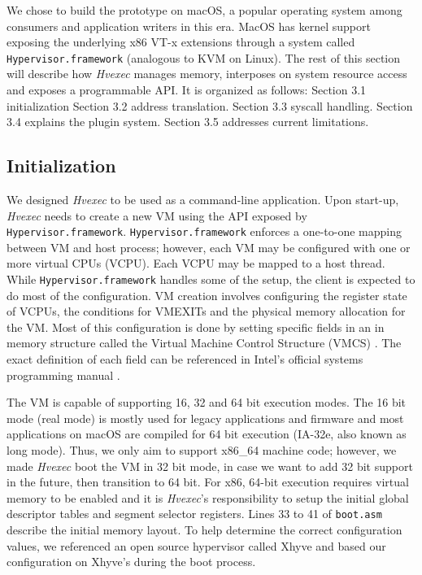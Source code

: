 \documentclass{article}
\newcommand{\PROJNAME}{\textit{Hvexec}}
\begin{document}
We chose to build the prototype on macOS, a popular operating system among consumers and application writers in this era.
MacOS has kernel support exposing the underlying x86 VT-x extensions through a system called \texttt{Hypervisor.framework} (analogous to KVM on Linux).
The rest of this section will describe how \PROJNAME{} manages memory, interposes on system resource access and exposes a programmable API. It is organized as follows: Section 3.1 initialization Section 3.2 address translation. Section 3.3 syscall handling. Section 3.4 explains the plugin system. Section 3.5 addresses current limitations.

\subsection{Initialization}
We designed \PROJNAME{} to be used as a command-line application.
Upon start-up, \PROJNAME{} needs to create a new VM using the API exposed by \texttt{Hypervisor.framework}.
\texttt{Hypervisor.framework} enforces a one-to-one mapping between VM and host process; however, each VM may be configured with one or more virtual CPUs (VCPU). Each VCPU may be mapped to a host thread.
While \texttt{Hypervisor.framework} handles some of the setup, the client is expected to do most of the configuration.
VM creation involves configuring the register state of VCPUs, the conditions for VMEXITs and the physical memory allocation for the VM.
Most of this configuration is done by setting specific fields in an in memory structure called the Virtual Machine Control Structure (VMCS) \cite{intelmanual}.
The exact definition of each field can be referenced in Intel's official systems programming manual \cite{intelmanual}.

The VM is capable of supporting 16, 32 and 64 bit execution modes.
The 16 bit mode (real mode) is mostly used for legacy applications and firmware and most applications on macOS are compiled for 64 bit execution (IA-32e, also known as long mode).
Thus, we only aim to support x86\_64 machine code; however, we made \PROJNAME{} boot the VM in 32 bit mode, in case we want to add 32 bit support in the future, then transition to 64 bit.
For x86, 64-bit execution requires virtual memory to be enabled and it is \PROJNAME{}'s responsibility to setup the initial global descriptor tables and segment selector registers.
Lines 33 to 41 of \texttt{boot.asm} describe the initial memory layout.
To help determine the correct configuration values, we referenced an open source hypervisor called Xhyve and based our configuration on Xhyve's during the boot process.
\end{document}
